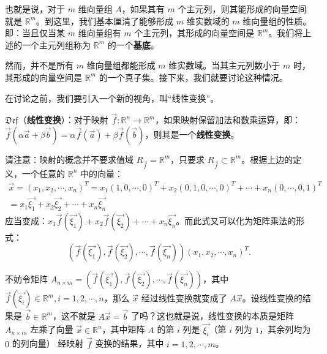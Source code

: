 \documentclass[b5paper]{ctexart}
\newcommand{\R}{\mathbb{R}}
\newcommand \ding[2]{$\mathfrak{Def}$（\textbf{#1}）：#2}
\begin{document}
	\vspace{12pt}
	
	也就是说，对于 $m$ 维向量组 $A$，如果其有 $m$ 个主元列，则其能形成的向量空间就是 $\R^m$。到这里，我们基本厘清了能够形成 $m$ 维实数域的 $m$ 维向量组的性质。即：当且仅当某 $m$ 维向量组有 $m$ 个主元列，其形成的向量空间是 $\R^m$。我们将上述的一个主元列组称为 $\R^m$ 的一个\textbf{基底}。
	
	然而，并不是所有 $m$ 维向量组都能形成 $m$ 维实数域。当其主元列数小于 $m$ 时，其形成的向量空间是 $\R^m$ 的一个真子集。接下来，我们就要讨论这种情况。
	
	在讨论之前，我们要引入一个新的视角，叫“线性变换”。
		
	\vspace{12pt}
	
	\ding{线性变换}{对于映射 $\vec{f}: \R^n \to \R^m$，如果映射保留加法和数乘运算，即：$\vec{f}(\alpha \vec{a} + \beta \vec{b}) = \alpha \vec{f}(\vec{a}) + \beta \vec{f}(\vec{b})$，则其是一个\textbf{线性变换}。}
	
	\vspace{12pt}

	请注意：映射的概念并不要求值域 $R_{\vec{f}} = \R^m$，只要求 $R_{\vec{f}} \subset \R^m$。根据上边的定义，一个任意的 $\R^n$ 中的向量： 
	\begin{equation*}
		\begin{split}
			\vec{x} = (x_1, x_2, \cdots, x_n)^T = x_1(1,0, \cdots, 0)^T + x_2(0, 1, 0, \cdots,0)^T + \cdots + x_n(0,\cdots, 0, 1)^T \\ 
			 = x_1 \vec{\xi_1} + x_2 \vec{\xi_2} + \cdots + x_n \vec{\xi_n}
		\end{split}
	\end{equation*}
	 应当变成：$x_1 \vec{f}(\vec{\xi_1}) + x_2 \vec{f}(\vec{\xi_2}) + \cdots + x_n \vec{\xi_n}$。而此式又可以化为矩阵乘法的形式：
	 \begin{equation*}
	 	(\vec{f}(\vec{\xi_1}), \vec{f}(\vec{\xi_2}), \cdots, \vec{f}(\vec{\xi_n})) (x_1, x_2, \cdots, x_n)^T.
	 \end{equation*}
	   
	 不妨令矩阵 $A_{n \times m} = (\vec{f}(\vec{\xi_1}), \vec{f}(\vec{\xi_2}), \cdots, \vec{f}(\vec{\xi_n}))$，其中 $\vec{f}(\vec{\xi_i}) \in \R^m, i = 1, 2, \cdots, n$，那么 $\vec{x}$ 经过线性变换就变成了 $A\vec{x}$。设线性变换的结果是 $\vec{b} \in \R^m$，这不就是 $A\vec{x} = \vec{b}$ 了吗？这也就是说，线性变换的本质是矩阵 $A_{n \times m}$ 左乘了向量 $\vec{x} \in \R^n$，其中矩阵 $A$ 的第 $i$ 列是 $\vec{\xi_i}$（第 $i$ 列为 $1$，其余列均为 $0$ 的列向量） 经映射 $\vec{f}$ 变换的结果，其中 $i = 1, 2, \cdots, m$。
	 
\end{document}
